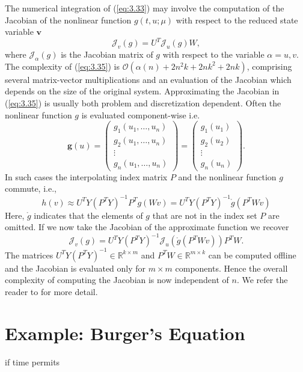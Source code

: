 The numerical integration of (\ref{eq:3.33}) may involve the computation of the Jacobian of the nonlinear function $g(t, u; \mu)$ with respect to the reduced state variable $\mathbf v$
\begin{equation} \label{eq:3.35}
	\mathcal J_{ v}(g) = U^T \mathcal J_{u} (g) W,
\end{equation}
where $\mathcal J_\alpha(g)$ is the Jacobian matrix of $g$ with respect to the variable $\alpha = u,v$. The complexity of (\ref{eq:3.35}) is $\mathcal{O}(\alpha(n) +2n^2k+2nk^2+2nk)$, comprising several matrix-vector multiplications and an evaluation of the Jacobian which depends on the size of the original system. Approximating the Jacobian in (\ref{eq:3.35}) is usually both problem and discretization dependent. Often the nonlinear function $g$ is evaluated component-wise i.e.
\begin{equation} \label{eq:3.36}
	\mathbf g(u) =
	\begin{pmatrix}
		g_1(u_1,\dots,u_n) \\
		g_2(u_1,\dots,u_n) \\
		\vdots \\
		g_n(u_1,\dots,u_n)
	\end{pmatrix}
	=
	\begin{pmatrix}
		g_1(u_1) \\
		g_2(u_2) \\
		\vdots \\
		g_n(u_n)
	\end{pmatrix}.
\end{equation}
In such cases the interpolating index matrix $P$ and the nonlinear function $ g$ commute, i.e.,
\begin{equation} \label{eq:3.37}
	h (v) \approx U^T Y(P^TY)^{-1}P^T g(Wv) = U^T Y(P^TY)^{-1} \mathring g(P^TW v)
\end{equation}
Here, $\mathring g$ indicates that the elements of $g$ that are not in the index set $P$ are omitted. If we now take the Jacobian of the approximate function we recover
\begin{equation} \label{eq:3.38}
	\mathcal J_{v}(g) = U^T Y(P^TY)^{-1} \mathcal J_{u}( \mathring g(P^T W v) ) P^T W.
\end{equation}
The matrices $U^T Y(P^TY)^{-1} \in \mathbb R^{k\times m}$ and $P^TW \in \mathbb R^{m\times k}$ can be computed offline and the Jacobian is evaluated only for $m\times m$ components. Hence the overall complexity of computing the Jacobian is now independent of $n$. We refer the reader to \cite{doi:10.1137/090766498,barrault2004empirical,quarteroni2015reduced,hesthaven2015certified} for more detail.

\section{Example: Burger's Equation}
if time permits
